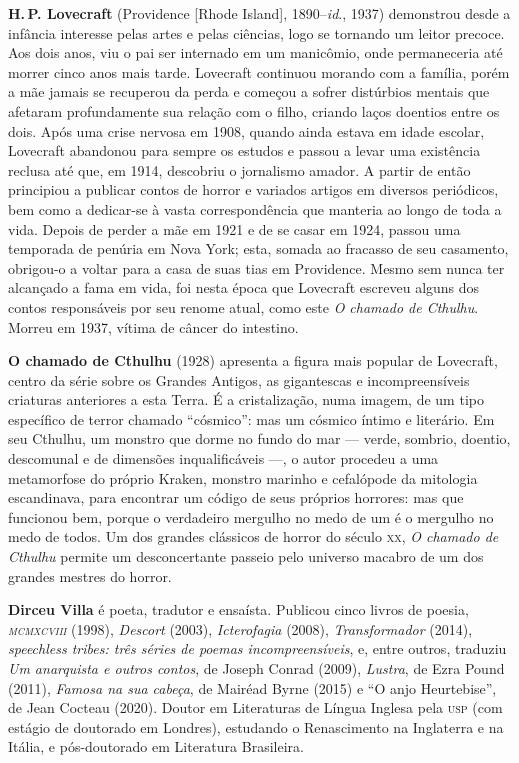 \textbf{H.\,P. Lovecraft} (Providence [Rhode Island], 1890--\emph{id}., 1937) demonstrou desde a infância interesse pelas artes e
pelas ciências, logo se tornando um leitor precoce. Aos dois anos, viu o pai ser internado em um manicômio, onde permaneceria até
morrer cinco anos mais tarde. Lovecraft continuou morando com a família,
porém a mãe jamais se recuperou da perda e começou a sofrer 
distúrbios mentais que afetaram profundamente sua relação com o filho,
criando laços doentios entre os dois. Após uma crise nervosa em 1908,
quando ainda estava em idade escolar, Lovecraft abandonou para sempre os
estudos e passou a levar uma existência reclusa até que, em 1914,
descobriu o jornalismo amador. A partir de então principiou a publicar
contos de horror e variados artigos em diversos periódicos, bem como a dedicar-se à vasta
correspondência que manteria ao longo de toda a vida.
Depois de perder a mãe em 1921 e de se casar em 1924, passou uma temporada
de penúria em Nova York; esta, somada ao fracasso de seu casamento,
obrigou-o a voltar para a casa de suas tias em Providence.
Mesmo sem nunca ter alcançado a fama em vida, foi nesta época que
Lovecraft escreveu alguns dos contos responsáveis por seu renome atual,
como este \emph{O chamado de Cthulhu}.
Morreu em 1937, vítima de câncer do intestino.

\textbf{O chamado de Cthulhu} (1928) apresenta a figura mais popular de Lovecraft, centro da série sobre os Grandes Antigos, as gigantescas e incompreensíveis criaturas anteriores a esta Terra. É a cristalização, numa imagem, de um tipo específico de terror chamado ``cósmico'': mas um cósmico íntimo e literário. Em seu Cthulhu, um monstro que dorme no fundo do mar --- verde, sombrio, doentio, descomunal e de dimensões inqualificáveis ---, o autor procedeu a uma metamorfose do próprio Kraken, monstro marinho e cefalópode da mitologia escandinava, para encontrar um código de seus próprios horrores: mas que funcionou bem, porque o verdadeiro mergulho no medo de um é o mergulho no medo de todos. Um dos grandes clássicos de horror do século \textsc{xx}, \textit{O chamado de Cthulhu} permite um desconcertante passeio pelo universo macabro de um dos grandes mestres do horror.

 
\textbf{Dirceu Villa} é poeta, tradutor e ensaísta. Publicou cinco livros de poesia, \emph{\textsc{mcmxcviii}} (1998), \emph{Descort} (2003), \emph{Icterofagia} (2008), \emph{Transformador} (2014), \emph{speechless tribes: três séries de poemas incompreensíveis}, e, entre outros, traduziu \emph{Um anarquista e outros contos}, de Joseph Conrad (2009), \emph{Lustra}, de Ezra Pound (2011), \emph{Famosa na sua cabeça}, de Mairéad Byrne (2015) e ``O anjo Heurtebise'', de Jean Cocteau (2020). Doutor em Literaturas de Língua Inglesa pela \textsc{usp} (com estágio de doutorado em Londres), estudando o Renascimento na Inglaterra e na Itália, e pós-doutorado em Literatura Brasileira.

